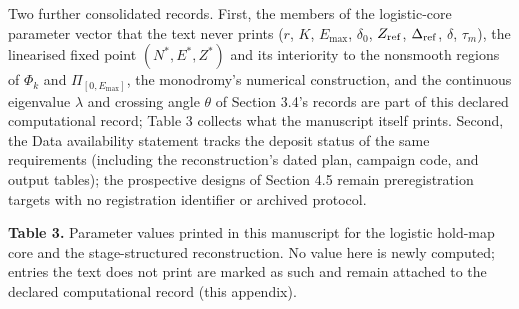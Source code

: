 \documentclass[11pt]{article}
\begin{document}
Two further consolidated records. First, the members of the
logistic-core parameter vector that the text never prints (\(r\), \(K\),
\(E_{\max}\), \(\delta_0\), \(Z_{\rm ref}\), \(\Delta_{\rm ref}\),
\(\delta\), \(\tau_m\)), the linearised fixed point \((N^*, E^*, Z^*)\)
and its interiority to the nonsmooth regions of \(\Phi_k\) and
\(\Pi_{[0,E_{\max}]}\), the monodromy's numerical construction, and the
continuous eigenvalue \(\lambda\) and crossing angle \(\theta\) of
Section 3.4's records are part of this declared computational record;
Table 3 collects what the manuscript itself prints. Second, the Data
availability statement tracks the deposit status of the same
requirements (including the reconstruction's dated plan, campaign code,
and output tables); the prospective designs of Section 4.5 remain
preregistration targets with no registration identifier or archived
protocol.

\textbf{Table 3.} Parameter values printed in this manuscript for the
logistic hold-map core and the stage-structured reconstruction. No value
here is newly computed; entries the text does not print are marked as
such and remain attached to the declared computational record (this
appendix).
\end{document}

